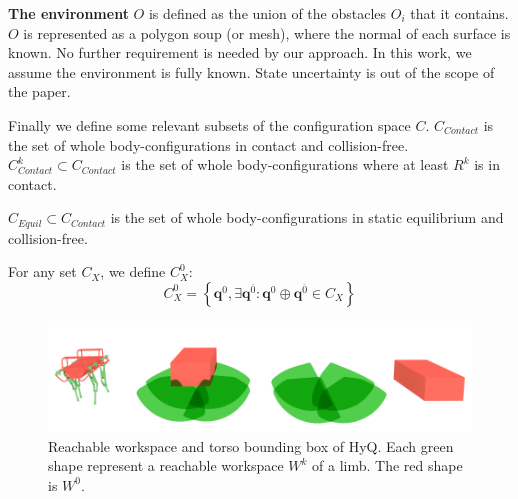 
\medskip
\textbf{The environment} $O$ is defined as the union of the obstacles $O_i$ that it contains. $O$ is represented
as a polygon soup (or mesh), where the normal of each surface is known. No further requirement is needed
by our approach. In this work, we assume the environment is fully known. State uncertainty is out of the scope of the paper.

\medskip
Finally we define some relevant subsets of the configuration space $C$.
$C_{Contact}$ is the set of whole body-configurations in contact and collision-free.
$C_{Contact}^k \subset C_{Contact}$ is the set of whole body-configurations where at least $R^k$ is in contact.

\medskip
$C_{Equil} \subset C_{Contact}$ is the set of whole body-configurations in static equilibrium and collision-free.

\medskip
For any set $C_{X}$, we define $C_{X}^0$:
\begin{equation*}
  C_{X}^0 = \left\{ \mathbf{q}^{0},  \exists \mathbf{q}^{\overline{0}}: \mathbf{q}^0  \oplus \mathbf{q}^{\overline{0}} \in C_{X} \right\}
\end{equation*}

\begin{figure}
  \centering
  \includegraphics[width=1\linewidth]{figures/HyQ_roms}
  \caption{
           Reachable workspace and torso bounding box of HyQ. Each green shape represent a reachable workspace $W^k$ of a limb. The red shape is $W^0$.}
		   \label{fig:HyQ_roms}
\end{figure}

